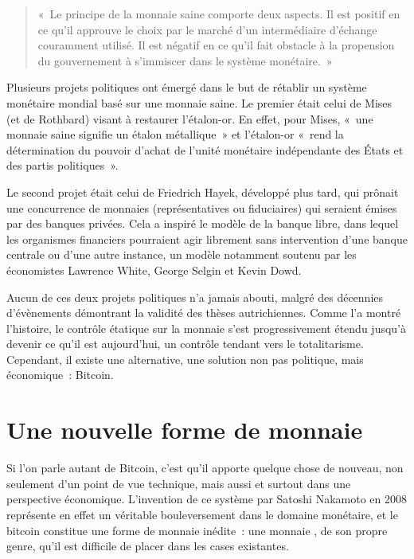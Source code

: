 \begin{quote}
«~Le principe de la monnaie saine comporte deux aspects. Il est positif en ce qu'il approuve le choix par le marché d'un intermédiaire d'échange couramment utilisé. Il est négatif en ce qu'il fait obstacle à la propension du gouvernement à s'immiscer dans le système monétaire.~»
\end{quote}

Plusieurs projets politiques ont émergé dans le but de rétablir un système monétaire mondial basé sur une monnaie saine. Le premier était celui de Mises (et de Rothbard) visant à restaurer l'étalon-or. En effet, pour Mises, «~une monnaie saine signifie un étalon métallique~» et l'étalon-or «~rend la détermination du pouvoir d'achat de l'unité monétaire indépendante des États et des partis politiques~».

Le second projet était celui de Friedrich Hayek, développé plus tard, qui prônait une concurrence de monnaies (représentatives ou fiduciaires) qui seraient émises par des banques privées. Cela a inspiré le modèle de la banque libre, dans lequel les organismes financiers pourraient agir librement sans intervention d'une banque centrale ou d'une autre instance, un modèle notamment soutenu par les économistes Lawrence White, George Selgin et Kevin Dowd.

Aucun de ces deux projets politiques n'a jamais abouti, malgré des décennies d'évènements démontrant la validité des thèses autrichiennes. Comme l'a montré l'histoire, le contrôle étatique sur la monnaie s'est progressivement étendu jusqu'à devenir ce qu'il est aujourd'hui, un contrôle tendant vers le totalitarisme. Cependant, il existe une alternative, une solution non pas politique, mais économique~: Bitcoin.

\section*{Une nouvelle forme de monnaie}

Si l'on parle autant de Bitcoin, c'est qu'il apporte quelque chose de nouveau, non seulement d'un point de vue technique, mais aussi et surtout dans une perspective économique. L'invention de ce système par Satoshi Nakamoto en 2008 représente en effet un véritable bouleversement dans le domaine monétaire, et le bitcoin constitue une forme de monnaie inédite~: une monnaie , de son propre genre, qu'il est difficile de placer dans les cases existantes.

